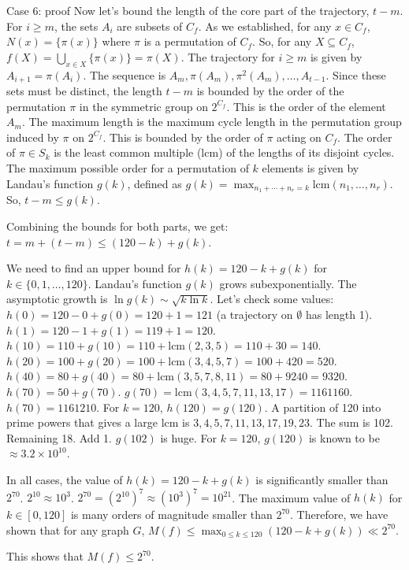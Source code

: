 \documentclass{article} %
\begin{document}
\begin{promptbox}{Case 6: proof}
Now let's bound the length of the core part of the trajectory, $t-m$.
For $i \ge m$, the sets $A_i$ are subsets of $C_f$.
As we established, for any $x \in C_f$, $N(x) = \{\pi(x)\}$ where $\pi$ is a permutation of $C_f$.
So, for any $X \subseteq C_f$, $f(X) = \bigcup_{x \in X} \{\pi(x)\} = \pi(X)$.
The trajectory for $i \ge m$ is given by $A_{i+1} = \pi(A_i)$.
The sequence is $A_m, \pi(A_m), \pi^2(A_m), \ldots, A_{t-1}$.
Since these sets must be distinct, the length $t-m$ is bounded by the order of the permutation $\pi$ in the symmetric group on $2^{C_f}$. This is the order of the element $A_m$. The maximum length is the maximum cycle length in the permutation group induced by $\pi$ on $2^{C_f}$. This is bounded by the order of $\pi$ acting on $C_f$.
The order of $\pi \in S_k$ is the least common multiple (lcm) of the lengths of its disjoint cycles. The maximum possible order for a permutation of $k$ elements is given by Landau's function $g(k)$, defined as $g(k) = \max_{n_1+\cdots+n_r=k} \text{lcm}(n_1, \ldots, n_r)$.
So, $t-m \le g(k)$.

Combining the bounds for both parts, we get:
$t = m + (t-m) \le (120-k) + g(k)$.

We need to find an upper bound for $h(k) = 120-k+g(k)$ for $k \in \{0, 1, \ldots, 120\}$.
Landau's function $g(k)$ grows subexponentially. The asymptotic growth is $\ln g(k) \sim \sqrt{k \ln k}$.
Let's check some values:
$h(0) = 120-0+g(0) = 120+1 = 121$ (a trajectory on $\emptyset$ has length 1).
$h(1) = 120-1+g(1) = 119+1 = 120$.
$h(10) = 110+g(10) = 110+\text{lcm}(2,3,5) = 110+30 = 140$.
$h(20) = 100+g(20) = 100+\text{lcm}(3,4,5,7) = 100+420 = 520$.
$h(40) = 80+g(40) = 80+\text{lcm}(3,5,7,8,11) = 80+9240 = 9320$.
$h(70) = 50+g(70)$. $g(70)=\text{lcm}(3,4,5,7,11,13,17)=1161160$. $h(70) = 1161210$.
For $k=120$, $h(120) = g(120)$. A partition of 120 into prime powers that gives a large lcm is $3,4,5,7,11,13,17,19,23$. The sum is 102. Remaining 18. Add 1. $g(102)$ is huge. For $k=120$, $g(120)$ is known to be $\approx 3.2 \times 10^{10}$.

In all cases, the value of $h(k)=120-k+g(k)$ is significantly smaller than $2^{70}$.
$2^{10} \approx 10^3$. $2^{70} = (2^{10})^7 \approx (10^3)^7 = 10^{21}$.
The maximum value of $h(k)$ for $k \in [0, 120]$ is many orders of magnitude smaller than $2^{70}$.
Therefore, we have shown that for any graph $G$, $M(f) \le \max_{0 \le k \le 120} (120-k+g(k)) \ll 2^{70}$.

This shows that $M(f) \leq 2^{70}$.
\end{promptbox}
\end{document}
